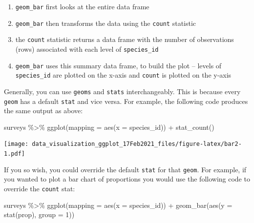 \documentclass[
]{article}
\newenvironment{Shaded}{\begin{snugshade}}{\end{snugshade}}
\newcommand{\AttributeTok}[1]{\textcolor[rgb]{0.77,0.63,0.00}{#1}}
\newcommand{\DecValTok}[1]{\textcolor[rgb]{0.00,0.00,0.81}{#1}}
\newcommand{\FunctionTok}[1]{\textcolor[rgb]{0.00,0.00,0.00}{#1}}
\newcommand{\NormalTok}[1]{#1}
\newcommand{\SpecialCharTok}[1]{\textcolor[rgb]{0.00,0.00,0.00}{#1}}
\providecommand{\tightlist}{%
  \setlength{\itemsep}{0pt}\setlength{\parskip}{0pt}}
\begin{document}
\begin{enumerate}
\def\labelenumi{\arabic{enumi}.}
\tightlist
\item
  \texttt{geom\_bar} first looks at the entire data frame\\
\item
  \texttt{geom\_bar} then transforms the data using the \texttt{count}
  statistic\\
\item
  the \texttt{count} statistic returns a data frame with the number of
  observations (rows) associated with each level of
  \texttt{species\_id}\\
\item
  \texttt{geom\_bar} uses this summary data frame, to build the plot --
  levels of \texttt{species\_id} are plotted on the x-axis and
  \texttt{count} is plotted on the y-axis
\end{enumerate}

Generally, you can use \texttt{geoms} and \texttt{stats}
interchangeably. This is because every \texttt{geom} has a default
\texttt{stat} and vice versa. For example, the following code produces
the same output as above:

\begin{Shaded}
\begin{Highlighting}[]
\NormalTok{surveys }\SpecialCharTok{\%\textgreater{}\%} 
  \FunctionTok{ggplot}\NormalTok{(}\AttributeTok{mapping =} \FunctionTok{aes}\NormalTok{(}\AttributeTok{x =}\NormalTok{ species\_id)) }\SpecialCharTok{+} 
  \FunctionTok{stat\_count}\NormalTok{()}
\end{Highlighting}
\end{Shaded}

\texttt{[image: data\_visualization\_ggplot\_17Feb2021\_files/figure-latex/bar2-1.pdf]}

If you so wish, you could override the default \texttt{stat} for that
\texttt{geom}. For example, if you wanted to plot a bar chart of
proportions you would use the following code to override the
\texttt{count} stat:

\begin{Shaded}
\begin{Highlighting}[]
\NormalTok{surveys }\SpecialCharTok{\%\textgreater{}\%} 
  \FunctionTok{ggplot}\NormalTok{(}\AttributeTok{mapping =} \FunctionTok{aes}\NormalTok{(}\AttributeTok{x =}\NormalTok{ species\_id)) }\SpecialCharTok{+} 
  \FunctionTok{geom\_bar}\NormalTok{(}\FunctionTok{aes}\NormalTok{(}\AttributeTok{y =} \FunctionTok{stat}\NormalTok{(prop), }\AttributeTok{group =} \DecValTok{1}\NormalTok{))}
\end{Highlighting}
\end{Shaded}
\end{document}
